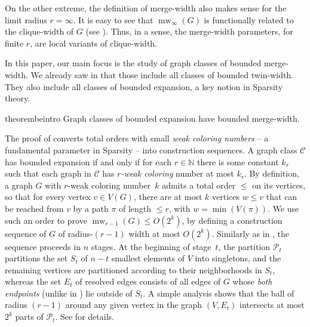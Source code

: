 \documentclass[11pt]{article}
\newcommand{\jan}[1]{\todo[color=green!40]{jan: #1}}
\theoremstyle{remark}
\def\cal{\mathcal}
\def\N{\mathbb N}
\renewcommand{\subset}{\subseteq}
\renewcommand{\le}{\leqslant}
\newcommand{\CC}{\cal C}
\DeclareMathOperator{\mw}{mw}
\begin{document}
On the other extreme, the definition of merge-width also makes sense for the limit radius $r=\infty$.
It is easy to see that $\mw_\infty(G)$ is functionally related to the clique-width of $G$ (see ).
Thus, in a sense, the merge-width parameters, for finite $r$, are local variants of clique-width.



In this paper, our main focus is the study of graph classes of bounded merge-width.
We already saw in  that those include all classes of bounded twin-width.
They also include all classes of bounded expansion, a key notion in Sparsity theory.




\begin{restatable}{theorem}{beintro}
  \label{thm:be}
  Graph classes of bounded expansion have bounded merge-width.
\end{restatable}
\noindent The proof of  converts total orders with small \emph{weak coloring numbers} -- a fundamental parameter in Sparsity -- into construction sequences. A graph class $\CC$ has bounded expansion if and only if
for each $r\in\N$ there is some constant $k_r$ such that each graph in $\CC$ has \emph{$r$-weak coloring} number at most $k_r$.
By definition, a graph $G$ with $r$-weak coloring number~$k$ admits a total order $\le$ on its vertices, so that
for every vertex $v\in V(G)$, there are at most $k$ vertices $w\le v$ that can be reached from $v$ by a path $\pi$ of length ${\le}r$, with $w=\min(V(\pi))$.
We use such an order to prove $\mw_{r-1}(G)\le O(2^k)$, by defining a construction sequence of $G$ of radius-$(r-1)$ width at most $O(2^k)$.
Similarly as in , the sequence proceeds in $n$ stages. At the beginning of stage~$t$, the partition $\cal P_t$ partitions the set $S_t$
of $n-t$ smallest elements of $V$ into singletons, and the remaining vertices are partitioned according to their neighborhoods in $S_t$, whereas the set $E_t$ of resolved edges consists of all edges of $G$ whose \emph{both endpoints} (unlike in ) lie outside of $S_t$. A simple analysis shows that the ball of radius $(r-1)$ around any given vertex in the graph $(V,E_t)$ intersects at most $2^k$ parts of $\cal P_t$.
See  for details.
\end{document}
